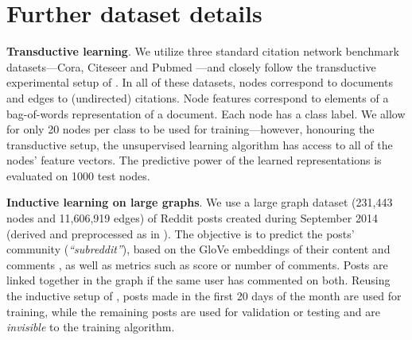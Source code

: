 \documentclass{article} \usepackage{iclr2019_conference,times}
\newtheorem{lemma}{Lemma}
\newcommand{\xhdr}[1]{{\noindent\bfseries #1}.}
\begin{document}
\begin{comment}
\begin{lemma}
Let  be a set of node representations drawn from an empirical probability distribution of graphs, , with finite number of elements, , such that .
Let  be a deterministic function on graphs and  be the summary vector with marginal distribution .
The optimal classifier between a balanced mixture between the joint distribution  and the product of marginals  has an error rate of .
\label{lemma}
\end{lemma}
\begin{proof}
As  is deterministic, samples from the joint,  are drawn from the product of marginals with probability , where  is the Dirac delta.
The probability of drawing any sample of the joint from the product of marginals is then . 
As the probability of drawing  from the joint is , we know that classifying these samples as coming from the joint has a lower error than classifying them as coming from the product of marginals.
The error rate of such a classifier then is the probability of drawing a sample from the joint as a sample from product of marginals under the mixture probability, or .
\end{proof}
\end{comment}




\appendix

\section{Further dataset details}\label{app:data}

\xhdr{Transductive learning}
We utilize three standard citation network benchmark datasets---Cora, Citeseer and Pubmed \citep{sen2008collective}---and closely follow the transductive experimental setup of \cite{yang2016revisiting}. In all of these datasets, nodes correspond to documents and edges to (undirected) citations. Node features correspond to elements of a bag-of-words representation of a document. Each node has a class label. We allow for only 20 nodes per class to be used for training---however, honouring the transductive setup, the unsupervised learning algorithm has access to all of the nodes' feature vectors. The predictive power of the learned representations is evaluated on 1000 test nodes.

\xhdr{Inductive learning on large graphs}
We use a large graph dataset (231,443 nodes and 11,606,919 edges) of Reddit posts created during September 2014 (derived and preprocessed as in \cite{hamilton2017inductive}). The objective is to predict the posts' community (\emph{``subreddit''}), based on the GloVe embeddings of their content and comments \citep{pennington2014glove}, as well as metrics such as score or number of comments. Posts are linked together in the graph if the same user has commented on both. Reusing the inductive setup of \cite{hamilton2017inductive}, posts made in the first 20 days of the month are used for training, while the remaining posts are used for validation or testing and are \emph{invisible} to the training algorithm.
\end{document}
